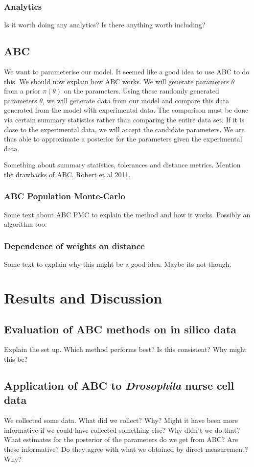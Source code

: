 \documentclass[twocolumn]{biophys}
\begin{document}
\subsubsection{Analytics}
Is it worth doing any analytics? Is there anything worth including?

\subsection{ABC}
We want to parameterise our model. It seemed like a good idea to use ABC to do this. We should now explain how ABC works.
We will generate parameters $\theta$ from a prior $\pi(\theta)$ on the parameters.
Using these randomly generated parameters $\theta$, we will generate data from our model and compare this data generated from the model with experimental data.
The comparison must be done via certain summary statistics rather than comparing the entire data set. 
If it is close to the experimental data, we will accept the candidate parameters.
We are thus able to approximate a posterior for the parameters given the experimental data.

Something about summary statistics, tolerances and distance metrics.
Mention the drawbacks of ABC. Robert et al 2011.

\subsubsection{ABC Population Monte-Carlo}
Some text about ABC PMC to explain the method and how it works. Possibly an algorithm too.

\subsubsection{Dependence of weights on distance}
Some text to explain why this might be a good idea. Maybe its not though.

\section{Results and Discussion}
\subsection{Evaluation of ABC methods on in silico data}
Explain the set up.
Which method performs best? Is this consistent?
Why might this be?

\subsection{Application of ABC to \textit{Drosophila} nurse cell data}
We collected some data.
What did we collect? Why? Might it have been more informative if we could have collected something else?
Why didn't we do that?
What estimates for the posterior of the parameters do we get from ABC?
Are these informative?
Do they agree with what we obtained by direct measurement? Why?
\end{document}
